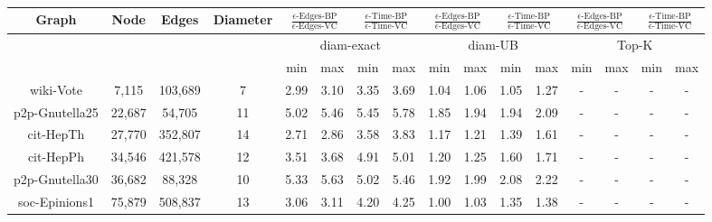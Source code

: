 \begin{table*}[ht]
\centering %
\begin{tabular}{|c c c c | c c | c c | c c | c c | c c | c c|} %
\hline\hline %
Graph & Node & Edges & Diameter  & \multicolumn{2}{|c|}{$\frac{\epsilon\mbox{-Edges-BP}}{ \epsilon\mbox{-Edges-VC}}$} & \multicolumn{2}{c|}{$\frac{\epsilon\mbox{-Time-BP}}{\epsilon\mbox{-Time-VC}}$} & \multicolumn{2}{c|}{$\frac{\epsilon\mbox{-Edges-BP}}{ \epsilon\mbox{-Edges-VC}}$} & \multicolumn{2}{c|}{$\frac{\epsilon\mbox{-Time-BP}}{\epsilon\mbox{-Time-VC}}$} & \multicolumn{2}{c|}{$\frac{\epsilon\mbox{-Edges-BP}}{ \epsilon\mbox{-Edges-VC}}$} & \multicolumn{2}{c|}{$\frac{\epsilon\mbox{-Time-BP}}{\epsilon\mbox{-Time-VC}}$}\\ [0.5ex] %
\hline
&  &  & &\multicolumn{4}{|c|}{diam-exact}  &  \multicolumn{4}{c|}{diam-UB} & \multicolumn{4}{c|}{Top-K}\\
\hline %
&  &  & &min & max & min & max&min & max & min & max &min & max & min & max\\
\hline %
wiki-Vote & 7,115 & 103,689  & 7 & 2.99 & 3.10 & 3.35 & 3.69 & 1.04 & 1.06 &1.05 & 1.27 & - & - & - & -\\
p2p-Gnutella25 & 22,687 & 54,705 & 11 & 5.02 & 5.46 & 5.45 & 5.78 & 1.85& 1.94& 1.94 & 2.09 & - & - & - &-\\
cit-HepTh & 27,770 & 352,807 & 14  & 2.71 & 2.86 & 3.58 & 3.83 & 1.17 & 1.21 & 1.39 & 1.61 & - & -  & - & -\\
cit-HepPh & 34,546 & 421,578 & 12 & 3.51 & 3.68 & 4.91 & 5.01 & 1.20 & 1.25& 1.60 & 1.71 & - & -  &-  &-\\ %
p2p-Gnutella30 & 36,682 & 88,328 & 10  & 5.33 & 5.63 & 5.02 & 5.46 & 1.92 & 1.99 & 2.08 & 2.22 & - & - & - & -\\
soc-Epinions1 & 75,879 & 508,837 & 13  & 3.06&  3.11 & 4.20 & 4.25 & 1.00 & 1.03 & 1.35 & 1.38 & - &  - & - & -\\ [1ex] %
\hline %
\end{tabular}
\caption{
}
\label{table:expDir} %
\end{table*}

